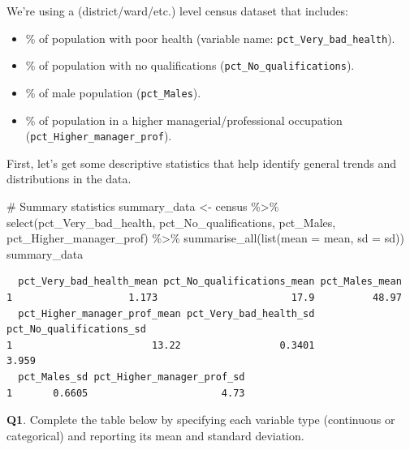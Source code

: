 \documentclass[
  letterpaper,
  DIV=11,
  numbers=noendperiod]{scrreprt}
\newenvironment{Shaded}{\begin{snugshade}}{\end{snugshade}}
\newcommand{\AttributeTok}[1]{\textcolor[rgb]{0.40,0.45,0.13}{#1}}
\newcommand{\CommentTok}[1]{\textcolor[rgb]{0.37,0.37,0.37}{#1}}
\newcommand{\FunctionTok}[1]{\textcolor[rgb]{0.28,0.35,0.67}{#1}}
\newcommand{\NormalTok}[1]{\textcolor[rgb]{0.00,0.23,0.31}{#1}}
\newcommand{\OtherTok}[1]{\textcolor[rgb]{0.00,0.23,0.31}{#1}}
\newcommand{\SpecialCharTok}[1]{\textcolor[rgb]{0.37,0.37,0.37}{#1}}
\providecommand{\tightlist}{%
  \setlength{\itemsep}{0pt}\setlength{\parskip}{0pt}}\usepackage{longtable,booktabs,array}
\begin{document}
We're using a (district/ward/etc.) level census dataset that includes:

\begin{itemize}
\tightlist
\item
  \% of population with poor health (variable name:
  \texttt{pct\_Very\_bad\_health}).
\item
  \% of population with no qualifications
  (\texttt{pct\_No\_qualifications}).
\item
  \% of male population (\texttt{pct\_Males}).
\item
  \% of population in a higher managerial/professional occupation
  (\texttt{pct\_Higher\_manager\_prof}).
\end{itemize}

First, let's get some descriptive statistics that help identify general
trends and distributions in the data.

\begin{Shaded}
\begin{Highlighting}[]
\CommentTok{\# Summary statistics}
\NormalTok{summary\_data }\OtherTok{\textless{}{-}}\NormalTok{ census }\SpecialCharTok{\%\textgreater{}\%}
  \FunctionTok{select}\NormalTok{(pct\_Very\_bad\_health, pct\_No\_qualifications, pct\_Males, pct\_Higher\_manager\_prof) }\SpecialCharTok{\%\textgreater{}\%}
  \FunctionTok{summarise\_all}\NormalTok{(}\FunctionTok{list}\NormalTok{(}\AttributeTok{mean =}\NormalTok{ mean, }\AttributeTok{sd =}\NormalTok{ sd))}
\NormalTok{summary\_data}
\end{Highlighting}
\end{Shaded}

\begin{verbatim}
  pct_Very_bad_health_mean pct_No_qualifications_mean pct_Males_mean
1                    1.173                       17.9          48.97
  pct_Higher_manager_prof_mean pct_Very_bad_health_sd pct_No_qualifications_sd
1                        13.22                 0.3401                    3.959
  pct_Males_sd pct_Higher_manager_prof_sd
1       0.6605                       4.73
\end{verbatim}

\textbf{Q1}. Complete the table below by specifying each variable type
(continuous or categorical) and reporting its mean and standard
deviation.
\end{document}
